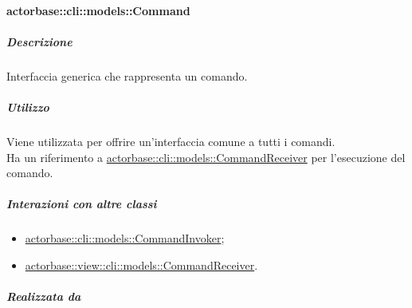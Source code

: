 \documentclass{scalatekids-article}
\begin{document}
\paragraph{actorbase::cli::models::Command}
\label{sec:actorbase::cli::models::Command}

\subparagraph{Descrizione}

Interfaccia generica che rappresenta un comando.

\subparagraph{Utilizzo}

Viene utilizzata per offrire un'interfaccia comune a tutti i comandi.\\Ha un
riferimento a \hyperref[sec:actorbase::cli::models::CommandReceiver]{actorbase::cli::models::CommandReceiver} per l'esecuzione del
comando.

\subparagraph{Interazioni con altre classi}

\begin{itemize}
	\item \hyperref[sec:actorbase::cli::models::CommandInvoker]{actorbase::cli::models::CommandInvoker};
	\item \hyperref[sec:actorbase::view::cli::models::CommandReceiver]{actorbase::view::cli::models::CommandReceiver}.
\end{itemize}

\subparagraph{Realizzata da}
\end{document}
